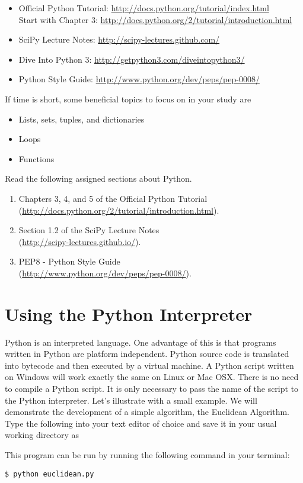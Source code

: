 \begin{itemize}
\item Official Python Tutorial: \url{http://docs.python.org/tutorial/index.html} \\
      Start with Chapter 3: \url{http://docs.python.org/2/tutorial/introduction.html}
\item SciPy Lecture Notes: \url{http://scipy-lectures.github.com/}
\item Dive Into Python 3: \url{http://getpython3.com/diveintopython3/}
\item Python Style Guide: \url{http://www.python.org/dev/peps/pep-0008/}
\end{itemize}
If time is short, some beneficial topics to focus on in your study are
\begin{itemize}
\item Lists, sets, tuples, and dictionaries
\item Loops
\item Functions
\end{itemize}

\begin{problem}
Read the following assigned sections about Python.
\begin{enumerate}
\item Chapters 3, 4, and 5 of the Official Python Tutorial \\
        (\url{http://docs.python.org/2/tutorial/introduction.html}).
\item Section 1.2 of the SciPy Lecture Notes \\
        (\url{http://scipy-lectures.github.io/}).
\item PEP8 - Python Style Guide \\
        (\url{http://www.python.org/dev/peps/pep-0008/}).
\end{enumerate}
\end{problem}

\section*{Using the Python Interpreter}
Python is an interpreted language.
One advantage of this is that programs written in Python are platform independent.
Python source code is translated into bytecode and then executed by a virtual machine.
A Python script written on Windows will work exactly the same on Linux or Mac OSX.
There is no need to compile a Python script.
It is only necessary to pass the name of the script to the Python interpreter.
Let's illustrate with a small example.
We will demonstrate the development of a simple algorithm, the Euclidean Algorithm.
Type the following into your text editor of choice and save it in your usual working directory as 

This program can be run by running the following command in your terminal:
\begin{lstlisting}
$ python euclidean.py
\end{lstlisting}

